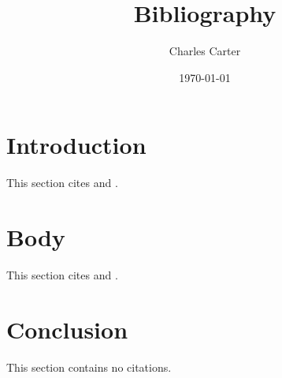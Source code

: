 \documentclass{article}
\title{Bibliography}
\author{Charles Carter}
\date{\today{}}
\begin{document}
 
    \maketitle{}
    \tableofcontents{}
    \section{Introduction}
    \label{inTroduction}
    This section cites \cite{goossens04} and \cite{oetiker15}.
    \section{Body}
    \label{Body}
    This section cites \cite{kottwitz15} and \cite{pakin15}.
    \section{Conclusion}
    This section contains no citations.
    \label{Conclusion}
        
    
    \nocite{*}
\end{document}
